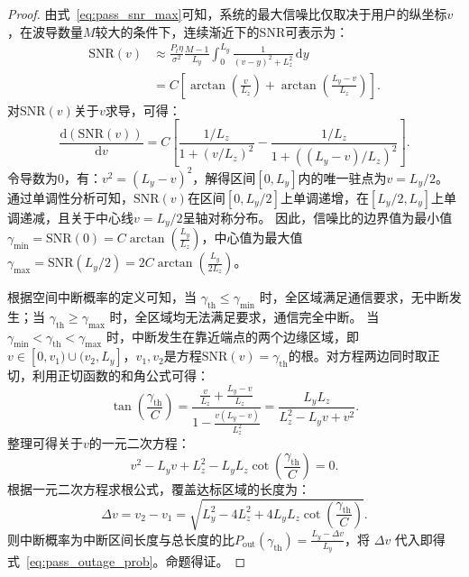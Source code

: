 \begin{proof}
	由式~\eqref{eq:pass_snr_max}可知，系统的最大信噪比仅取决于用户的纵坐标$v$，在波导数量$M$较大的条件下，连续渐近下的SNR可表示为：
	\begin{align}\label{eq:pass_snr_v_approx}
		\mathrm{SNR}(v) &\approx \frac{P_t \eta}{\sigma^2} \frac{M-1}{L_y} \int_0^{L_y} \frac{1}{(v - y)^2 + L_z^2} \,\mathrm{d}y \nonumber \\
		&= C \left[ \arctan\left(\frac{v}{L_z}\right) + \arctan\left(\frac{L_y - v}{L_z}\right) \right].
	\end{align}
	对$\mathrm{SNR}(v)$关于$v$求导，可得：
	\begin{equation}
		\frac{\mathrm{d}(\mathrm{SNR}(v))}{\mathrm{d}v} = C \left[ \frac{1/L_z}{1 + (v/L_z)^2} - \frac{1/L_z}{1 + ((L_y - v)/L_z)^2} \right].
	\end{equation}
	令导数为0，有：$v^2 = (L_y - v)^2$，解得区间$[0, L_y]$内的唯一驻点为$v = L_y/2$。
	通过单调性分析可知，$\mathrm{SNR}(v)$在区间$[0, L_y/2]$上单调递增，在$[L_y/2, L_y]$上单调递减，且关于中心线$v = L_y/2$呈轴对称分布。
	因此，信噪比的边界值为最小值$\gamma_{\min} = \mathrm{SNR}(0) = C \arctan\left(\frac{L_y}{L_z}\right)$，中心值为最大值$\gamma_{\max} = \mathrm{SNR}(L_y/2) = 2C \arctan\left(\frac{L_y}{2L_z}\right)$。
	
	根据空间中断概率的定义可知，当 $\gamma_{\mathrm{th}} \le \gamma_{\min}$ 时，全区域满足通信要求，无中断发生；当 $\gamma_{\mathrm{th}} \ge \gamma_{\max}$ 时，全区域均无法满足要求，通信完全中断。
	当 $\gamma_{\min} < \gamma_{\mathrm{th}} < \gamma_{\max}$ 时，中断发生在靠近端点的两个边缘区域，即$v \in [0, v_1) \cup (v_2, L_y]$，$v_1,v_2$是方程$\mathrm{SNR}(v) = \gamma_{\mathrm{th}}$的根。对方程两边同时取正切，利用正切函数的和角公式可得：
	\begin{equation}
		\tan\left(\frac{\gamma_{\mathrm{th}}}{C}\right) = \frac{\frac{v}{L_z} + \frac{L_y - v}{L_z}}{1 - \frac{v(L_y - v)}{L_z^2}} = \frac{L_y L_z}{L_z^2 - L_y v + v^2}.
	\end{equation}
	整理可得关于$v$的一元二次方程：
	\begin{equation}
		v^2 - L_y v + L_z^2 - L_y L_z \cot\left(\frac{\gamma_{\mathrm{th}}}{C}\right) = 0.
	\end{equation}
	根据一元二次方程求根公式，覆盖达标区域的长度为：
	\begin{equation}
		\Delta v = v_2 - v_1 = \sqrt{L_y^2 - 4L_z^2 + 4L_y L_z \cot(\frac{\gamma_{\mathrm{th}}}{C})}.
	\end{equation}
	则中断概率为中断区间长度与总长度的比$P_{\mathrm{out}}(\gamma_{\mathrm{th}}) = \frac{L_y - \Delta v}{L_y}$，将 $\Delta v$ 代入即得式~\eqref{eq:pass_outage_prob}。命题得证。
\end{proof}

